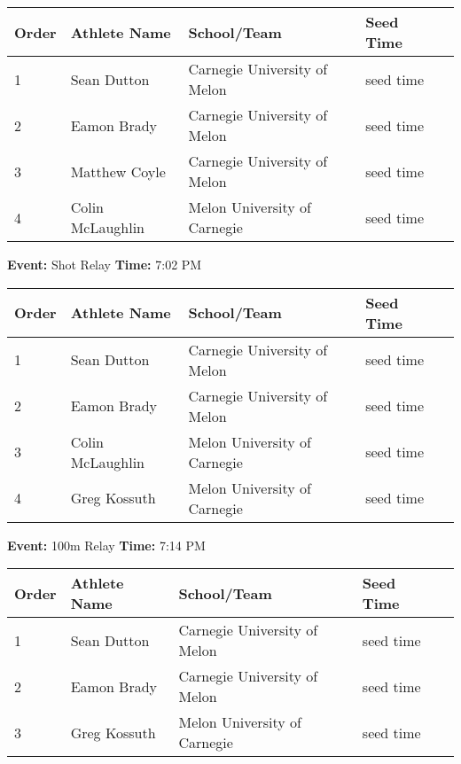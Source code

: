 \documentclass[11pt]{article}
\begin{document}
\vspace{1em}
\begin{tabular}{@{}lllll@{}}
\toprule
\textbf{Order} & \textbf{Athlete Name} & \textbf{School/Team} & \textbf{Seed Time} \\
\midrule
1 & Sean Dutton & Carnegie University of Melon & seed time &\\
2 & Eamon Brady & Carnegie University of Melon & seed time &\\
3 & Matthew Coyle & Carnegie University of Melon & seed time &\\
4 & Colin McLaughlin & Melon University of Carnegie & seed time &\\
\bottomrule
\end{tabular}
\vspace{2.5em}


\textbf{Event:} Shot Relay \quad \textbf{Time:} 7:02 PM 

\vspace{1em}
\begin{tabular}{@{}lllll@{}}
\toprule
\textbf{Order} & \textbf{Athlete Name} & \textbf{School/Team} & \textbf{Seed Time} \\
\midrule
1 & Sean Dutton & Carnegie University of Melon & seed time &\\
2 & Eamon Brady & Carnegie University of Melon & seed time &\\
3 & Colin McLaughlin & Melon University of Carnegie & seed time &\\
4 & Greg Kossuth & Melon University of Carnegie & seed time &\\
\bottomrule
\end{tabular}
\vspace{2.5em}


\textbf{Event:} 100m Relay \quad \textbf{Time:} 7:14 PM 

\vspace{1em}
\begin{tabular}{@{}lllll@{}}
\toprule
\textbf{Order} & \textbf{Athlete Name} & \textbf{School/Team} & \textbf{Seed Time} \\
\midrule
1 & Sean Dutton & Carnegie University of Melon & seed time &\\
2 & Eamon Brady & Carnegie University of Melon & seed time &\\
3 & Greg Kossuth & Melon University of Carnegie & seed time &\\
\bottomrule
\end{tabular}
\vspace{2.5em}
\end{document}
